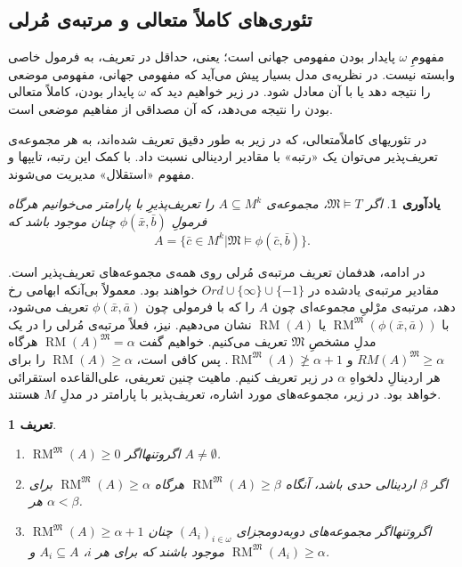\documentclass[12pt,a4paper]{report}
\theoremstyle{colorhead}
\newtheorem{defn}[thm]{تعریف}
\newtheorem{yad}[thm]{یادآوری}
\DeclareMathOperator{\RM}{RM}
\begin{document}
\subsection{تئوری‌های کاملاً متعالی
و مرتبه‌ی مُرلی}
مفهومِ 
$\omega$
پایدار بودن مفهومی جهانی است؛‌ یعنی، حداقل در تعریف، به فرمول خاصی وابسته نیست. 
در نظریه‌ی مدل بسیار پیش می‌آید که مفهومی جهانی،‌ مفهومی موضعی را نتیجه دهد یا با آن  معادل شود. 
در زیر خواهیم دید که 
$\omega$
پایدار بودن، کاملاً متعالی بودن را نتیجه می‌دهد، که آن مصداقی از مفاهیم موضعی است. 
\par 
در تئوریهای کاملاً‌متعالی، که در زیر به طور دقیق تعریف شده‌اند، به هر مجموعه‌ی تعریف‌پذیر 
می‌توان یک «رتبه» با مقادیر اردینالی نسبت داد. با کمک این رتبه، تایپها و مفهوم «استقلال»  مدیریت می‌شوند. 
\begin{yad}
اگر
$\mathfrak{M}\models T$،
مجموعه‌ی
$A\subseteq M^k$
را تعریف‌پذیرِ با پارامتر می‌خوانیم
هرگاه فرمولِ
$\phi(\bar{x},\bar{b})$
چنان موجود باشد که
\[
A=\{\bar{c}\in M^k|\mathfrak{M}\models \phi(\bar{c},\bar{b})\}.
\]
\end{yad}
در ادامه‌، هدفمان تعریف مرتبه‌ی مُرلی روی همه‌‌‌ی مجموعه‌های تعریف‌پذیر است. مقادیر مرتبه‌ی یادشده در 
$Ord\cup \{\infty\}\cup \{-1\}$
خواهند بود. معمولاً بی‌آنکه ابهامی رخ دهد، 
مرتبه‌ی مرْلیِ مجموعه‌ای چون
$A$
را که با فرمولی چون
$\phi(\bar{x},\bar{a})$
تعریف می‌شود،
با
$\RM^\mathfrak{M}(\phi(\bar{x},\bar{a}))$
یا
$\RM(A)$
نشان می‌دهیم. نیز، فعلاً مرتبه‌ی مُرلی را در یک مدلِ 
مشخصِ
$\mathfrak{M}$
تعریف می‌کنیم. خواهیم گفت
$\RM(A)^\mathfrak{M}=\alpha$
هرگاه
$RM(A)^\mathfrak{M}\geq \alpha$
و 
$\RM^\mathfrak{M}(A)\not\geq \alpha+1$.
پس کافی است، 
$\RM(A)\geq \alpha$
را برای هر اردینالِ دلخواهِ
$\alpha$
در زیر تعریف کنیم.  ماهیت چنین تعریفی، علی‌القاعده استقرائی خواهد  بود.
در زیر،
مجموعه‌های مورد اشاره،‌ تعریف‌پذیر با پارامتر در مدلِ
$M$
هستند.
\hfill 
{}
\begin{defn}
\hfill
\begin{enumerate}
\item
$\RM^\mathfrak{M}(A)\geq 0$
اگروتنهااگر
$A\not=\emptyset$.
\item 
اگر
$\beta$
اردینالی حدی باشد، آنگاه
$\RM^\mathfrak{M}(A)\geq \beta$
هرگاه
$\RM^\mathfrak{M}(A)\geq \alpha$
برای هر
$\alpha<\beta$.
\item 
$\RM^\mathfrak{M}(A)\geq \alpha+1$
اگروتنهااگر مجموعه‌های دوبه‌دومجزای
$(A_i)_{i\in \omega}$
چنان موجود باشند که برای هر
$i$،
$A_i\subseteq A$
و
$\RM^\mathfrak{M}(A_i)\geq \alpha$.
\end{enumerate}
\end{defn}
\end{document}

